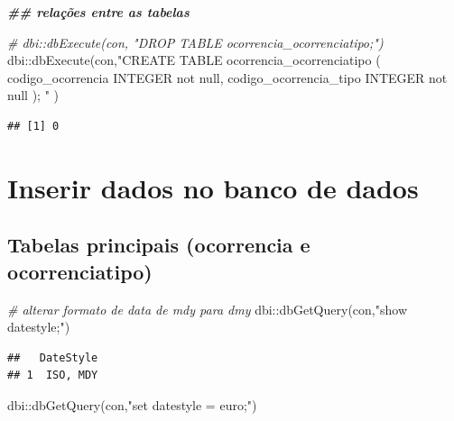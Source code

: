 \documentclass[
]{article}
\newenvironment{Shaded}{\begin{snugshade}}{\end{snugshade}}
\newcommand{\CommentTok}[1]{\textcolor[rgb]{0.56,0.35,0.01}{\textit{#1}}}
\newcommand{\DocumentationTok}[1]{\textcolor[rgb]{0.56,0.35,0.01}{\textbf{\textit{#1}}}}
\newcommand{\FunctionTok}[1]{\textcolor[rgb]{0.00,0.00,0.00}{#1}}
\newcommand{\NormalTok}[1]{#1}
\newcommand{\SpecialCharTok}[1]{\textcolor[rgb]{0.00,0.00,0.00}{#1}}
\newcommand{\StringTok}[1]{\textcolor[rgb]{0.31,0.60,0.02}{#1}}
\begin{document}
\begin{Shaded}
\begin{Highlighting}[]
\DocumentationTok{\#\# relações entre as tabelas}


\CommentTok{\# dbi::dbExecute(con, "DROP TABLE ocorrencia\_ocorrenciatipo;")}
\NormalTok{dbi}\SpecialCharTok{::}\FunctionTok{dbExecute}\NormalTok{(con,}\StringTok{"CREATE TABLE ocorrencia\_ocorrenciatipo (}
\StringTok{    codigo\_ocorrencia INTEGER not null,}
\StringTok{    codigo\_ocorrencia\_tipo INTEGER not null}
\StringTok{);}
\StringTok{"}
\NormalTok{)}
\end{Highlighting}
\end{Shaded}

\begin{verbatim}
## [1] 0
\end{verbatim}

\hypertarget{inserir-dados-no-banco-de-dados}{%
\section{Inserir dados no banco de
dados}\label{inserir-dados-no-banco-de-dados}}

\hypertarget{tabelas-principais-ocorrencia-e-ocorrenciatipo-1}{%
\subsection{Tabelas principais (ocorrencia e
ocorrenciatipo)}\label{tabelas-principais-ocorrencia-e-ocorrenciatipo-1}}

\begin{Shaded}
\begin{Highlighting}[]
\CommentTok{\# alterar formato de data de mdy para dmy}
\NormalTok{dbi}\SpecialCharTok{::}\FunctionTok{dbGetQuery}\NormalTok{(con,}\StringTok{"show datestyle;"}\NormalTok{)}
\end{Highlighting}
\end{Shaded}

\begin{verbatim}
##   DateStyle
## 1  ISO, MDY
\end{verbatim}

\begin{Shaded}
\begin{Highlighting}[]
\NormalTok{dbi}\SpecialCharTok{::}\FunctionTok{dbGetQuery}\NormalTok{(con,}\StringTok{"set datestyle = euro;"}\NormalTok{)}
\end{Highlighting}
\end{Shaded}
\end{document}
